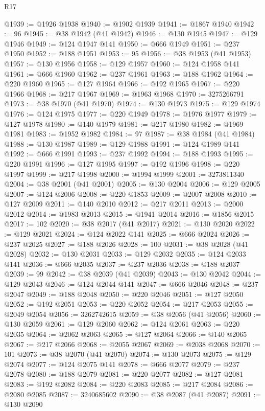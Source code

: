 \begin{lexlean}{R17}
\begin{coremodule}
@1939 := @1926 @1938
@1940 := @1902 @1939
@1941 := @1867 @1940
@1942 := 96
@1945 := @38 @1942 (@41 @1942)
@1946 := @130 @1945
@1947 := @129 @1946
@1949 := @124 @1947 @141
@1950 := @666 @1949
@1951 := @237 @1950
@1952 := @188 @1951
@1953 := 95
@1956 := @38 @1953 (@41 @1953)
@1957 := @130 @1956
@1958 := @129 @1957
@1960 := @124 @1958 @141
@1961 := @666 @1960
@1962 := @237 @1961
@1963 := @188 @1962
@1964 := @220 @1960
@1965 := @127 @1964
@1966 := @192 @1965
@1967 := @220 @1966
@1968 := @217 @1967
@1969 := @1963 @1968
@1970 := 3275266791
@1973 := @38 @1970 (@41 @1970)
@1974 := @130 @1973
@1975 := @129 @1974
@1976 := @124 @1975
@1977 := @220 @1949
@1978 := @1976 @1977
@1979 := @127 @1978
@1980 := @140 @1979
@1981 := @217 @1980
@1982 := @1969 @1981
@1983 := @1952 @1982
@1984 := 97
@1987 := @38 @1984 (@41 @1984)
@1988 := @130 @1987
@1989 := @129 @1988
@1991 := @124 @1989 @141
@1992 := @666 @1991
@1993 := @237 @1992
@1994 := @188 @1993
@1995 := @220 @1991
@1996 := @127 @1995
@1997 := @192 @1996
@1998 := @220 @1997
@1999 := @217 @1998
@2000 := @1994 @1999
@2001 := 3273811340
@2004 := @38 @2001 (@41 @2001)
@2005 := @130 @2004
@2006 := @129 @2005
@2007 := @124 @2006
@2008 := @220 @1853
@2009 := @2007 @2008
@2010 := @127 @2009
@2011 := @140 @2010
@2012 := @217 @2011
@2013 := @2000 @2012
@2014 := @1983 @2013
@2015 := @1941 @2014
@2016 := @1856 @2015
@2017 := 102
@2020 := @38 @2017 (@41 @2017)
@2021 := @130 @2020
@2022 := @129 @2021
@2024 := @124 @2022 @141
@2025 := @666 @2024
@2026 := @237 @2025
@2027 := @188 @2026
@2028 := 100
@2031 := @38 @2028 (@41 @2028)
@2032 := @130 @2031
@2033 := @129 @2032
@2035 := @124 @2033 @141
@2036 := @666 @2035
@2037 := @237 @2036
@2038 := @188 @2037
@2039 := 99
@2042 := @38 @2039 (@41 @2039)
@2043 := @130 @2042
@2044 := @129 @2043
@2046 := @124 @2044 @141
@2047 := @666 @2046
@2048 := @237 @2047
@2049 := @188 @2048
@2050 := @220 @2046
@2051 := @127 @2050
@2052 := @192 @2051
@2053 := @220 @2052
@2054 := @217 @2053
@2055 := @2049 @2054
@2056 := 3262742615
@2059 := @38 @2056 (@41 @2056)
@2060 := @130 @2059
@2061 := @129 @2060
@2062 := @124 @2061
@2063 := @220 @2035
@2064 := @2062 @2063
@2065 := @127 @2064
@2066 := @140 @2065
@2067 := @217 @2066
@2068 := @2055 @2067
@2069 := @2038 @2068
@2070 := 101
@2073 := @38 @2070 (@41 @2070)
@2074 := @130 @2073
@2075 := @129 @2074
@2077 := @124 @2075 @141
@2078 := @666 @2077
@2079 := @237 @2078
@2080 := @188 @2079
@2081 := @220 @2077
@2082 := @127 @2081
@2083 := @192 @2082
@2084 := @220 @2083
@2085 := @217 @2084
@2086 := @2080 @2085
@2087 := 3240685602
@2090 := @38 @2087 (@41 @2087)
@2091 := @130 @2090

\end{coremodule}
\end{lexlean}
